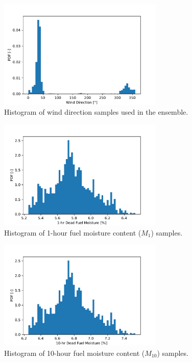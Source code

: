 \documentclass[../report/case_report.tex]{subfiles}
\begin{document}
\begin{figure}[h]
  \centering
  \includegraphics[width=0.7\textwidth]{../figures/hist_wd.pdf}
  \caption{Histogram of wind direction samples used in the ensemble.}
  \label{fig:hist_wd}
\end{figure}

\begin{figure}[h]
  \centering
  \includegraphics[width=0.7\textwidth]{../figures/hist_m1.pdf}
  \caption{Histogram of 1-hour fuel moisture content ($M_1$) samples.}
  \label{fig:hist_m1}
\end{figure}

\begin{figure}[h]
  \centering
  \includegraphics[width=0.7\textwidth]{../figures/hist_m10.pdf}
  \caption{Histogram of 10-hour fuel moisture content ($M_{10}$) samples.}
  \label{fig:hist_m10}
\end{figure}
\end{document}
